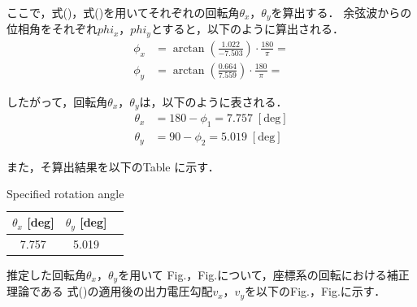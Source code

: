 ここで，式()，式()を用いてそれぞれの回転角$\theta_x$，$\theta_y$を算出する．
余弦波からの位相角をそれぞれ$phi_x$，$phi_y$とすると，以下のように算出される．
\begin{align}
	\phi_x &= \arctan \left(\frac{1.022}{-7.503}\right) \cdot \frac{180}{\pi} = \\
	\phi_y &= \arctan \left(\frac{0.664}{7.559}\right) \cdot \frac{180}{\pi} = 
\end{align}

したがって，回転角$\theta_x$，$\theta_y$は，以下のように表される．
\begin{align}
	\theta_x &= 180 - \phi_1 = 7.757 \; [\mathrm{deg}]\\
	\theta_y &= 90 - \phi_2 = 5.019 \; [\mathrm{deg}]
\end{align}

また，そ算出結果を以下のTable に示す．

\begin{table}[htbp]
  \begin{center}
      \caption{Specified rotation angle}
      \begin{tabular}{|p{30mm}|p{20mm}|p{20mm}|}
          \hline
          \multicolumn{1}{|c|}{$\theta_x$ [deg]} & \multicolumn{1}{|c|}{$\theta_y$ [deg]} \\ \hline
          \multicolumn{1}{|c|}{7.757}           & \multicolumn{1}{|c|}{5.019}           \\ \hline
      \end{tabular}
  \end{center}
\end{table}

\newpage
推定した回転角$\theta_x$，$\theta_y$を用いて
Fig.，Fig.について，座標系の回転における補正理論である
式()の適用後の出力電圧勾配$v_x$，$v_y$を以下のFig.，Fig.に示す．

